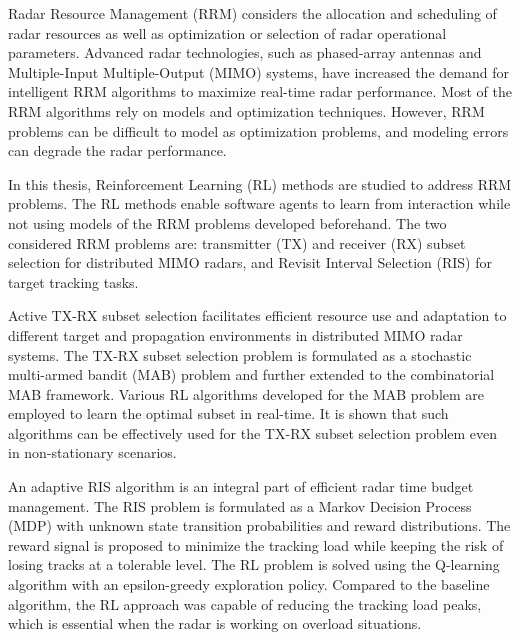 \documentclass[english, 12pt, a4paper, elec, utf8, a-1b, online]{aaltothesis}
\date{31.7.2020}
\begin{document}
\makecoverpage

\makecopyrightpage


\begin{abstractpage}[english]
Radar Resource Management (RRM) considers the allocation and scheduling of radar resources as well as optimization or selection of radar operational parameters.
Advanced radar technologies, such as phased-array antennas and Multiple-Input Multiple-Output (MIMO) systems, have increased the demand for intelligent RRM algorithms to maximize real-time radar performance. 
Most of the RRM algorithms rely on models and optimization techniques. 
However, RRM problems can be difficult to model as optimization problems, and modeling errors can degrade the radar performance.

In this thesis, Reinforcement Learning (RL) methods are studied to address RRM problems. 
The RL methods enable software agents to learn from interaction while not using models of the RRM problems developed beforehand. 
The two considered RRM problems are: transmitter (TX) and receiver (RX) subset selection for distributed MIMO radars, and Revisit Interval Selection (RIS) for target tracking tasks. 

Active TX-RX subset selection facilitates efficient resource use and adaptation to different target and propagation environments in distributed MIMO radar systems. 
The TX-RX subset selection problem is formulated as a stochastic multi-armed bandit (MAB) problem and further extended to the combinatorial MAB framework.
Various RL algorithms developed for the MAB problem are employed to learn the optimal subset in real-time. 
It is shown that such algorithms can be effectively used for the TX-RX subset selection problem even in non-stationary scenarios.

An adaptive RIS algorithm is an integral part of efficient radar time budget management.
The RIS problem is formulated as a Markov Decision Process (MDP) with unknown state transition probabilities and reward distributions. 
The reward signal is proposed to minimize the tracking load while keeping the risk of losing tracks at a tolerable level. 
The RL problem is solved using the Q-learning algorithm with an epsilon-greedy exploration policy.
Compared to the baseline algorithm, the RL approach was capable of reducing the tracking load peaks, which is essential when the radar is working on overload situations.
\end{abstractpage}
\end{document}
